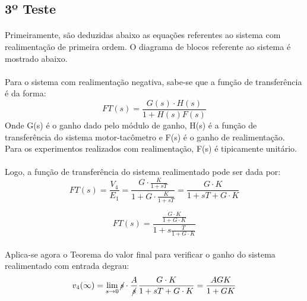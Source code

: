 \subsection{3º Teste}
\paragraph{}
Primeiramente, são deduzidas abaixo as equações referentes ao sistema com realimentação de primeira ordem. O diagrama de blocos referente ao sistema é mostrado abaixo.



\paragraph{}
Para o sistema com realimentação negativa, sabe-se que a função de transferência é da forma:
\begin{equation}
FT(s)=\frac{G(s)\cdot H(s)}{1+H(s)F(s)}
\end{equation}
Onde G(s) é o ganho dado pelo módulo de ganho, H(s) é a função de transferência do sistema motor-tacômetro e F(s) é o ganho de realimentação. Para os experimentos realizados com realimentação, F(s) é tipicamente unitário.

\paragraph{}
Logo, a função de transferência do sistema realimentado pode ser dada por:\\
\begin{equation}
FT(s)=\frac{V_4}{E_1}=\frac{G\cdot \frac{K}{1+sT}}{1+G\cdot\frac{K}{1+sT}}=\frac{G\cdot K}{1+ sT + G\cdot K}
\end{equation}

\begin{equation}
FT(s)=\frac{\frac{G\cdot K}{1 + G\cdot K}}{1+ s\frac{T}{1 + G\cdot K} }
\label{eq:eqDoJuara}
\end{equation}

\paragraph{}
Aplica-se agora o Teorema do valor final para verificar o ganho do sistema realimentado com entrada degrau:\\
\begin{equation}
v_4(\infty)= \lim_{s\rightarrow 0} \cancel{s}\cdot\frac{A}{\cancel{s}} \frac{G\cdot K}{1+ sT + G\cdot K} = \frac{AGK}{1+GK}
\end{equation}


